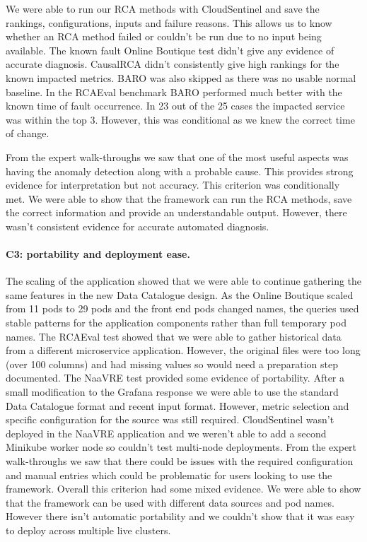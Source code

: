 We were able to run our RCA methods with CloudSentinel and save the rankings, configurations, inputs and failure reasons. This allows us to know whether an RCA method failed or couldn’t be run due to no input being available. The known fault Online Boutique test didn’t give any evidence of accurate diagnosis. CausalRCA didn’t consistently give high rankings for the known impacted metrics. BARO was also skipped as there was no usable normal baseline. In the RCAEval benchmark BARO performed much better with the known time of fault occurrence. In 23 out of the 25 cases the impacted service was within the top 3. However, this was conditional as we knew the correct time of change.

From the expert walk-throughs we saw that one of the most useful aspects was having the anomaly detection along with a probable cause. This provides strong evidence for interpretation but not accuracy. This criterion was conditionally met. We were able to show that the framework can run the RCA methods, save the correct information and provide an understandable output. However, there wasn’t consistent evidence for accurate automated diagnosis.

\paragraph{C3: portability and deployment ease.}

The scaling of the application showed that we were able to continue gathering the same features in the new Data Catalogue design. As the Online Boutique scaled from 11 pods to 29 pods and the front end pods changed names, the queries used stable patterns for the application components rather than full temporary pod names. The RCAEval test showed that we were able to gather historical data from a different microservice application. However, the original files were too long (over 100 columns) and had missing values so would need a preparation step documented. The NaaVRE test provided some evidence of portability. After a small modification to the Grafana response we were able to use the standard Data Catalogue format and recent input format. However, metric selection and specific configuration for the source was still required. CloudSentinel wasn’t deployed in the NaaVRE application and we weren’t able to add a second Minikube worker node so couldn’t test multi-node deployments. From the expert walk-throughs we saw that there could be issues with the required configuration and manual entries which could be problematic for users looking to use the framework. Overall this criterion had some mixed evidence. We were able to show that the framework can be used with different data sources and pod names. However there isn’t automatic portability and we couldn’t show that it was easy to deploy across multiple live clusters.

